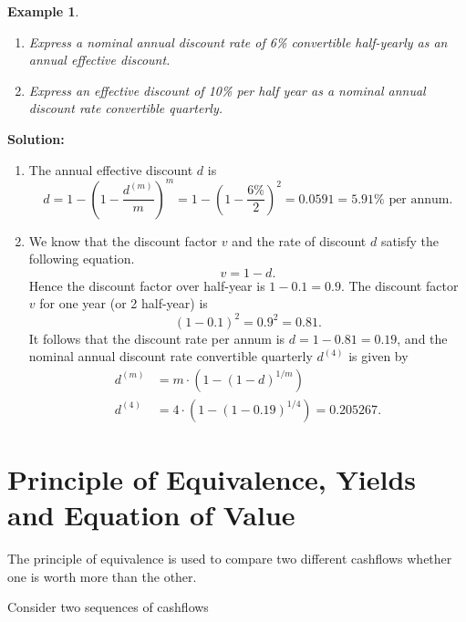 \documentclass[landscape, 20pt]{extreport}
\theoremstyle{definition}
\theoremstyle{definition}
\newtheorem{example}{Example}[chapter]
\theoremstyle{definition}
\theoremstyle{definition}
\theoremstyle{remark}
\begin{document}
\newpage \begin{example}
\protect\hypertarget{exm:unlabeled-div-36}{}\label{exm:unlabeled-div-36}

\begin{enumerate}
\def\labelenumi{\arabic{enumi}.}
\item
  \emph{Express a nominal annual discount rate of 6\% convertible
  half-yearly as an annual effective discount.}
\item
  \emph{Express an effective discount of 10\% per half year as a nominal
  annual discount rate convertible quarterly.}
\end{enumerate}

\end{example}

\textbf{Solution:}

\begin{enumerate}
\def\labelenumi{\arabic{enumi}.}
\item
  The annual effective discount \(d\) is
  \[d = 1-  \left(1 - \frac{d^{(m)}}{m}\right)^m = 1-  \left(1 - \frac{6\%}{2}\right)^2 = 0.0591 = 5.91\% \text{ per annum}.\]
\item
  We know that the discount factor \(v\) and the rate of discount \(d\)
  satisfy the following equation. \[v =  1- d.\] Hence the discount
  factor over half-year is \(1 - 0.1 = 0.9\). The discount factor \(v\)
  for one year (or 2 half-year) is \[(1-0.1)^2 = 0.9^2 = 0.81.\] It
  follows that the discount rate per annum is \(d = 1- 0.81 = 0.19\),
  and the nominal annual discount rate convertible quarterly \(d^{(4)}\)
  is given by \[\begin{aligned}
       d^{(m)} &= m \cdot \left( 1-      (1 - d)^{1/m}  \right) \\
       d^{(4)} &= 4 \cdot \left( 1-      (1 - 0.19)^{1/4}  \right) = 0.205267.
      \end{aligned}\]
\end{enumerate}

\hypertarget{principle-of-equivalence-yields-and-equation-of-value}{%
\section{Principle of Equivalence, Yields and Equation of Value}\label{principle-of-equivalence-yields-and-equation-of-value}}

The principle of equivalence is used to compare two different cashflows
whether one is worth more than the other.

Consider two sequences of cashflows
\end{document}

